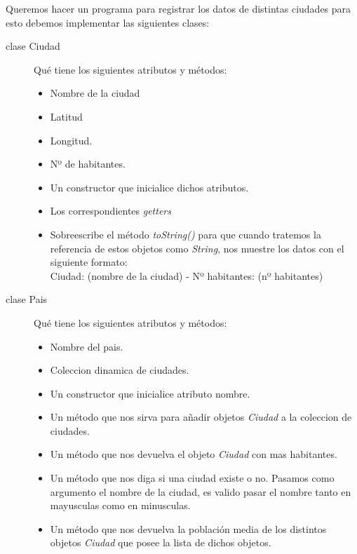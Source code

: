 \documentclass[addpoints,12pt]{exam}
\begin{document}
\begin{center}
\end{center}
\vspace{0.1in}
\begin{questions}
\question Queremos hacer un programa para registrar los datos de distintas ciudades para esto debemos implementar las siguientes clases:
\begin{description}
\item[clase Ciudad] Qué tiene los siguientes atributos y métodos:
\begin{itemize}
\item Nombre de la ciudad
\item Latitud
\item Longitud.
\item Nº de habitantes.
\item Un constructor que inicialice dichos atributos.
\item Los correspondientes \emph{getters}
\item Sobreescribe el método \emph{toString()} para que cuando tratemos la referencia de estos objetos como \emph{String}, nos muestre los datos con el siguiente formato:\\
Ciudad: (nombre de la ciudad) - Nº habitantes: (nº habitantes)
\end{itemize}
\item[clase Pais] Qué tiene los siguientes atributos y métodos:
\begin{itemize}
\item Nombre del pais.
\item Coleccion dinamica de ciudades.
\item Un constructor que inicialice atributo nombre.
\item Un método que nos sirva para añadir objetos \emph{Ciudad} a la coleccion de ciudades.
\item Un método que nos devuelva el objeto \emph{Ciudad} con mas habitantes.
\item Un método que nos diga si una ciudad existe o no. Pasamos como argumento el nombre de la ciudad, es valido pasar el nombre tanto en mayusculas como en minusculas.
\item Un método que nos devuelva la población media de los distintos objetos \emph{Ciudad} que posee la lista de dichos objetos.

\end{itemize}
\end{description}
\end{questions}
\end{document}
